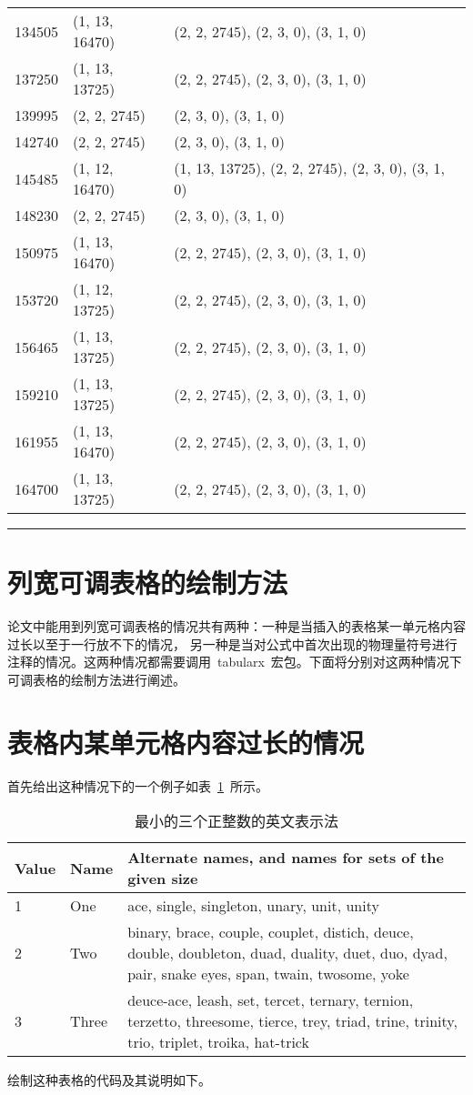 \begin{center}
\begin{longtable}{|l|l|l|}
		134505 & (1, 13, 16470) & (2, 2, 2745), (2, 3, 0), (3, 1, 0) \\
		137250 & (1, 13, 13725) & (2, 2, 2745), (2, 3, 0), (3, 1, 0) \\
		139995 & (2, 2, 2745) & (2, 3, 0), (3, 1, 0) \\
		142740 & (2, 2, 2745) & (2, 3, 0), (3, 1, 0) \\
		145485 & (1, 12, 16470) & (1, 13, 13725), (2, 2, 2745), (2, 3, 0), (3, 1, 0) \\
		148230 & (2, 2, 2745) & (2, 3, 0), (3, 1, 0) \\
		150975 & (1, 13, 16470) & (2, 2, 2745), (2, 3, 0), (3, 1, 0) \\
		153720 & (1, 12, 13725) & (2, 2, 2745), (2, 3, 0), (3, 1, 0) \\
		156465 & (1, 13, 13725) & (2, 2, 2745), (2, 3, 0), (3, 1, 0) \\
		159210 & (1, 13, 13725) & (2, 2, 2745), (2, 3, 0), (3, 1, 0) \\
		161955 & (1, 13, 16470) & (2, 2, 2745), (2, 3, 0), (3, 1, 0) \\
		164700 & (1, 13, 13725) & (2, 2, 2745), (2, 3, 0), (3, 1, 0) \\
	\end{longtable}
\end{center}

\noindent\hrule
\section{列宽可调表格的绘制方法}
论文中能用到列宽可调表格的情况共有两种：一种是当插入的表格某一单元格内容过长以至于一行放不下的情况，
另一种是当对公式中首次出现的物理量符号进行注释的情况。这两种情况都需要调用~tabularx~宏包。下面将分别对这两种情况下可调表格的绘制方法进行阐述。
\section{表格内某单元格内容过长的情况}

首先给出这种情况下的一个例子如表~\ref{tab:table3}~所示。
\begin{table}[htbp]
	\caption{最小的三个正整数的英文表示法}\label{tab:table3}
	\vspace{0.5em}
	\begin{tabularx}{\textwidth}{llX}
		\toprule[1.5pt]
		Value & Name & Alternate names, and names for sets of the given size\\\midrule[1pt]
		1 & One & ace, single, singleton, unary, unit, unity\\
		2 & Two & binary, brace, couple, couplet, distich, deuce, double, doubleton, duad, duality, duet, duo, dyad, pair, snake eyes, span, twain, twosome, yoke\\
		3 & Three & deuce-ace, leash, set, tercet, ternary, ternion, terzetto, threesome, tierce, trey, triad, trine, trinity, trio, triplet, troika, hat-trick\\\bottomrule[1.5pt]
	\end{tabularx}
	\vspace{\baselineskip}
\end{table}
绘制这种表格的代码及其说明如下。

